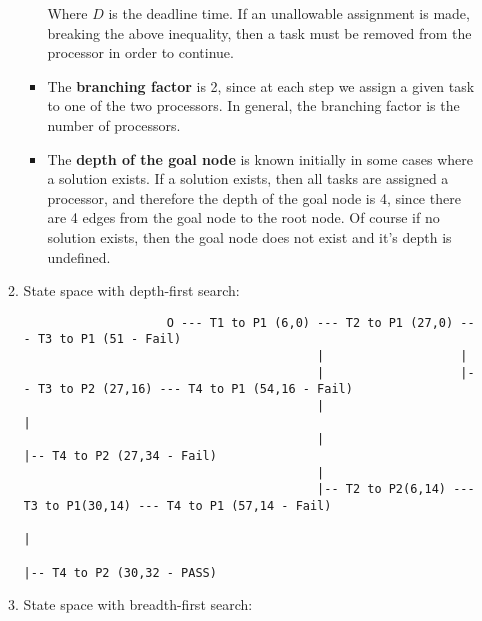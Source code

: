 \documentclass{article}
\begin{document}
\begin{enumerate}
\begin{enumerate}
\begin{itemize}
					Where $D$ is the deadline time.  If an unallowable assignment is made, breaking the above inequality, then a task must be removed from the processor in order to continue.
					
					\item The \textbf{branching factor} is 2, since at each step we assign a given task to one of the two processors.  In general, the branching factor is the number of processors.
					
					\item The \textbf{depth of the goal node} is known initially in some cases where a solution exists.  If a solution exists, then all tasks are assigned a processor, and therefore the depth of the goal node is 4, since there are 4 edges from the goal node to the root node.  Of course if no solution exists, then the goal node does not exist and it's depth is undefined.
				\end{itemize}
			
				\item State space with depth-first search:
				
				\begin{verbatim}
					O --- T1 to P1 (6,0) --- T2 to P1 (27,0) --- T3 to P1 (51 - Fail)
					                     |                   |
					                     |                   |-- T3 to P2 (27,16) --- T4 to P1 (54,16 - Fail)
					                     |                                        |
					                     |                                        |-- T4 to P2 (27,34 - Fail)
					                     |
					                     |-- T2 to P2(6,14) --- T3 to P1(30,14) --- T4 to P1 (57,14 - Fail)
					                                                            |
					                                                            |-- T4 to P2 (30,32 - PASS)
				\end{verbatim}
				
				\pagebreak
				
				\item State space with breadth-first search:
				

\end{enumerate}
\end{enumerate}
\end{document}

